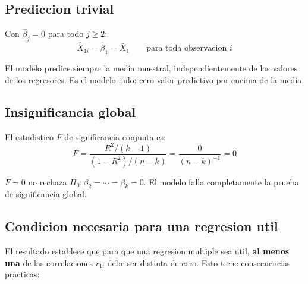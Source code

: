 \documentclass[12pt, letterpaper]{article}
\theoremstyle{remark}\newtheorem{obs}{Observacion}
\begin{document}
\subsection{Prediccion trivial}

Con $\hat\beta_j = 0$ para todo $j \geq 2$:
\begin{equation}
  \hat X_{1i} = \hat\beta_1 = \bar X_1 \qquad \text{para toda observacion } i
  \label{eq:pred_media}
\end{equation}

El modelo predice siempre la media muestral, independientemente de los valores de los regresores. Es el modelo nulo: cero valor predictivo por encima de la media.

\subsection{Insignificancia global}

El estadistico $F$ de significancia conjunta es:
\begin{equation}
  F = \frac{R^2/(k-1)}{(1-R^2)/(n-k)} = \frac{0}{(n-k)^{-1}} = 0
\end{equation}

$F = 0$ no rechaza $H_0: \beta_2 = \cdots = \beta_k = 0$. El modelo falla completamente la prueba de significancia global.

\subsection{Condicion necesaria para una regresion util}

El resultado establece que para que una regresion multiple sea util, \textbf{al menos una} de las correlaciones $r_{1i}$ debe ser distinta de cero. Esto tiene consecuencias practicas:
\end{document}
